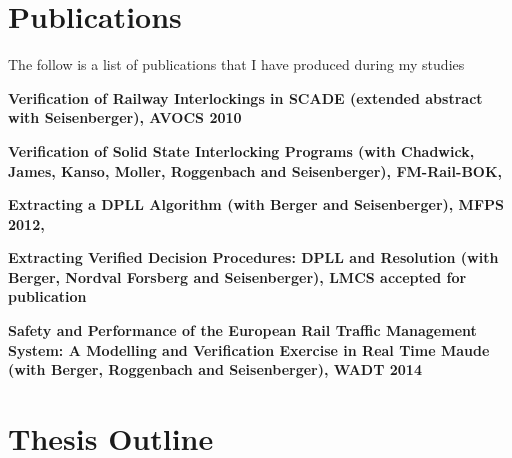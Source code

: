 \section{Publications}
The follow is a list of publications that I have produced during my studies

\textbf{Verification of Railway Interlockings in SCADE (extended abstract with Seisenberger), AVOCS 2010 \cite{AL10}} 

\textbf{Verification of Solid State Interlocking Programs (with Chadwick, James, Kanso, Moller, Roggenbach and Seisenberger), FM-Rail-BOK, \cite{AL14a}}

\textbf{Extracting a DPLL Algorithm (with Berger and Seisenberger), MFPS 2012, \cite{AL12}}

\textbf{Extracting Verified Decision Procedures: DPLL and Resolution (with Berger, Nordval Forsberg and Seisenberger), LMCS accepted for publication \cite{AL14b}}

\textbf{Safety and Performance of the European Rail Traffic Management System: A Modelling and Verification Exercise in Real Time Maude (with Berger, Roggenbach and Seisenberger), WADT 2014 \cite{AL14c}}


\section{Thesis Outline}

